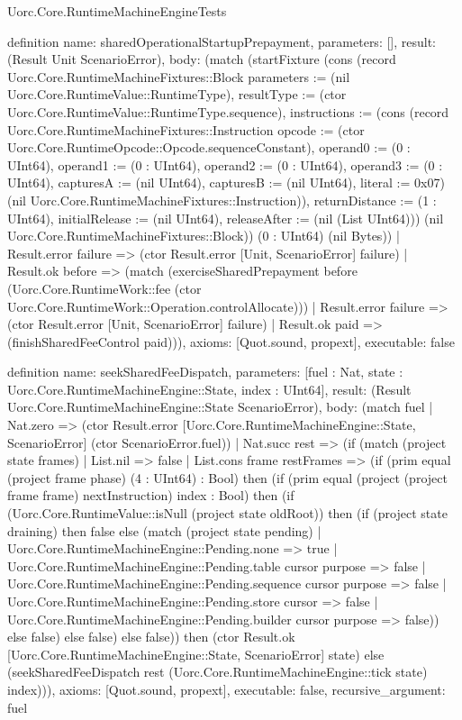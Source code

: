 \begin{lexlean}{Uorc.Core.RuntimeMachineEngineTests}
\begin{semanticmodule}
definition{
  name: sharedOperationalStartupPrepayment,
  parameters: [],
  result: (Result Unit ScenarioError),
  body: (match (startFixture (cons (record Uorc.Core.RuntimeMachineFixtures::Block {parameters := (nil Uorc.Core.RuntimeValue::RuntimeType), resultType := (ctor Uorc.Core.RuntimeValue::RuntimeType.sequence), instructions := (cons (record Uorc.Core.RuntimeMachineFixtures::Instruction {opcode := (ctor Uorc.Core.RuntimeOpcode::Opcode.sequenceConstant), operand0 := (0 : UInt64), operand1 := (0 : UInt64), operand2 := (0 : UInt64), operand3 := (0 : UInt64), capturesA := (nil UInt64), capturesB := (nil UInt64), literal := 0x07}) (nil Uorc.Core.RuntimeMachineFixtures::Instruction)), returnDistance := (1 : UInt64), initialRelease := (nil UInt64), releaseAfter := (nil (List UInt64))}) (nil Uorc.Core.RuntimeMachineFixtures::Block)) (0 : UInt64) (nil Bytes))
    | Result.error failure => (ctor Result.error [Unit, ScenarioError] failure)
    | Result.ok before => (match (exerciseSharedPrepayment before (Uorc.Core.RuntimeWork::fee (ctor Uorc.Core.RuntimeWork::Operation.controlAllocate)))
      | Result.error failure => (ctor Result.error [Unit, ScenarioError] failure)
      | Result.ok paid => (finishSharedFeeControl paid))),
  axioms: [Quot.sound, propext],
  executable: false
}

definition{
  name: seekSharedFeeDispatch,
  parameters: [fuel : Nat, state : Uorc.Core.RuntimeMachineEngine::State, index : UInt64],
  result: (Result Uorc.Core.RuntimeMachineEngine::State ScenarioError),
  body: (match fuel
    | Nat.zero => (ctor Result.error [Uorc.Core.RuntimeMachineEngine::State, ScenarioError] (ctor ScenarioError.fuel))
    | Nat.succ rest => (if (match (project state frames)
      | List.nil => false
      | List.cons frame restFrames => (if (prim equal (project frame phase) (4 : UInt64) : Bool) then (if (prim equal (project (project frame frame) nextInstruction) index : Bool) then (if (Uorc.Core.RuntimeValue::isNull (project state oldRoot)) then (if (project state draining) then false else (match (project state pending)
        | Uorc.Core.RuntimeMachineEngine::Pending.none => true
        | Uorc.Core.RuntimeMachineEngine::Pending.table cursor purpose => false
        | Uorc.Core.RuntimeMachineEngine::Pending.sequence cursor purpose => false
        | Uorc.Core.RuntimeMachineEngine::Pending.store cursor => false
        | Uorc.Core.RuntimeMachineEngine::Pending.builder cursor purpose => false)) else false) else false) else false)) then (ctor Result.ok [Uorc.Core.RuntimeMachineEngine::State, ScenarioError] state) else (seekSharedFeeDispatch rest (Uorc.Core.RuntimeMachineEngine::tick state) index))),
  axioms: [Quot.sound, propext],
  executable: false,
  recursive_argument: fuel
}


\end{semanticmodule}
\end{lexlean}
